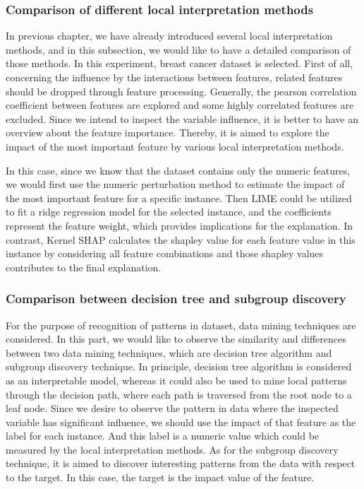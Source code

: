 \subsubsection{Comparison of different local interpretation methods}

In previous chapter, we have already introduced several local interpretation methods, and in this subsection, we would like to have a detailed comparison of those methods. In this experiment, breast cancer dataset is selected.  First of all, concerning the influence by the interactions between features, related features should be dropped through feature processing. Generally, the pearson correlation coefficient between features are explored and some highly correlated features are excluded. Since we intend to inspect the variable influence, it is better to have an overview about the feature importance. Thereby, it is aimed to explore the impact of the most important feature by various local interpretation methods. 

In this case, since we know that the dataset contains only the numeric features, we would first use the numeric perturbation method to estimate the impact of the most important feature for a specific instance. Then LIME could be utilized to fit a ridge regression model for the selected instance, and the coefficients represent the feature weight, which provides implications for the explanation. In contrast, Kernel SHAP calculates the shapley value for each feature value in this instance by considering all feature combinations and those shapley values contributes to the final explanation. 


\subsubsection{Comparison between decision tree and subgroup discovery}

For the purpose of recognition of patterns in dataset, data mining techniques are considered. In this part, we would like to observe the similarity and differences between two data mining techniques, which are decision tree algorithm and subgroup discovery technique. In principle, decision tree algorithm is considered as an interpretable model, whereas it could also be used to mine local patterns through the decision path, where each path is traversed from the root node to a leaf node. Since we desire to observe the pattern in data where the inspected variable has significant influence, we should use the impact of that feature as the label for each instance. And this label is a numeric value which could be measured by the local interpretation methods. As for the subgroup discovery technique, it is aimed to discover interesting patterns from the data with respect to the target. In this case, the target is the impact value of the feature. 


